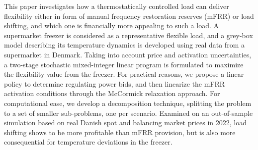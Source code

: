 This paper investigates how a  thermostatically controlled load can deliver flexibility either in form of manual frequency restoration reserves (mFRR) or load shifting, and which one is financially more appealing to such a load. %
A supermarket freezer is considered as a representative flexible load, and a grey-box model  describing its temperature dynamics is developed using real data from a supermarket in Denmark. Taking into account price and activation uncertainties, a two-stage stochastic mixed-integer linear program is formulated to maximize the flexibility value from the freezer. For practical reasons, we propose a linear policy to determine regulating power bids, and then linearize the mFRR activation conditions through the  McCormick relaxation approach. For computational ease, we develop a decomposition technique, splitting the problem to a set of smaller sub-problems, one per scenario. %
%
%
Examined on an out-of-sample simulation based on real Danish spot and balancing market prices in 2022, load shifting shows to be more profitable than mFRR provision, but is also more consequential for temperature deviations in the freezer.
